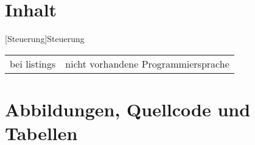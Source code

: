 \documentclass{scrbook}
\begin{document}
 
\chapter{Inhalt}
\begin{table}
  [Steuerung]{Steuerung}
  \label{code:Steuerung}
  \begin{tabular}{ll}
    bei listings & nicht vorhandene Programmiersprache
  \end{tabular}
\end{table}

\chapter{Abbildungen, Quellcode und Tabellen}
\renewcommand\lstlistlistingname{Quellcodeverzeichnis}
\lstlistoflistings
\end{document}
